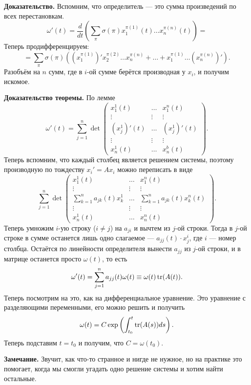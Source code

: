 \textbf{Доказательство.} Вспомним, что определитель --- это сумма произведений по всех перестановкам.
\[
    \omega'(t) = \frac{d}{dt} \left( \sum_{\pi} \sigma(\pi) x_1^{\pi(1)}(t) \dots x_n^{\pi(n)}(t) \right) = 
\]
Теперь продифференцируем:
\[
    = \sum_\pi \sigma(\pi) \left( (x_1^{\pi(1)})' x_2^{\pi(2)} \dots x_n^{\pi(n)} + \dots + x_1^{\pi(1)} \dots (x_n^{\pi(n)})' \right).
\]
Разобъём на $n$ сумм, где в $i$-ой сумме берётся производная у $x_i$, и получим искомое.

\QED

\textbf{Доказательство теоремы.} По лемме
\[
    \omega'(t) = \sum_{j=1}^{n} \det
    \begin{pmatrix}
        x_1^1(t) & \dots & x_1^n(t) \\
        \vdots & \vdots & \vdots \\
        (x_j^1)'(t) & \dots & (x_j^1)'(t) \\
        \vdots & \vdots & \vdots \\
        x_n^1(t) & \dots & x_n^b(t)
    \end{pmatrix} .
\]
Теперь вспомним, что каждый столбец является решением системы, поэтому производную по тождеству $x_i' = Ax_i$ можно переписать в виде
\[
    \sum_{j=1}^{n} \det
    \begin{pmatrix}
        x_1^1(t) & \dots & x_1^n(t) \\
        \vdots & \vdots & \vdots \\
        \sum_{k=1}^{n} a_{jk}(t) x_k^1 & \dots & \sum_{k=1}^{n} a_{jk}(t) x_k^n(t) \\
        \vdots & \vdots & \vdots \\
        x_n^1(t) & \dots & x_n^n(t)
    \end{pmatrix} .
\]
Теперь умножим $i$-ую строку ($i \ne j$) на $a_{ji}$ и вычтем из $j$-ой строки.
Тогда в $j$-ой строке в сумме останется лишь одно слагаемое --- $a_{jj}(t) \cdot x_j^i$, где $i$ --- номер столбца.
Остаётся по линейности определителя вынести $a_{jj}$ из $j$-ой строки, и в матрице останется просто $\omega(t)$, то есть
\[
    \omega'(t) = \sum_{j=1}^{n} a_{jj}(t) \omega(t) \equiv \omega(t) \operatorname{tr}(A(t)).
\]
Теперь посмотрим на это, как на дифференциальное уравнение. Это уравнение с разделяющими переменными, его можно решить и получить
\[
    \omega(t) = C \exp \left( \int_{t_0}^{t} \operatorname{tr}(A(s)) ds \right).
\]
Теперь подставим $t = t_0$ и получим, что $C = \omega(t_0)$.

\QED

\textbf{Замечание.} Звучит, как что-то странное и нигде не нужное, но на практике это помогает, когда мы смогли угадать одно решение системы и хотим найти остальные.

